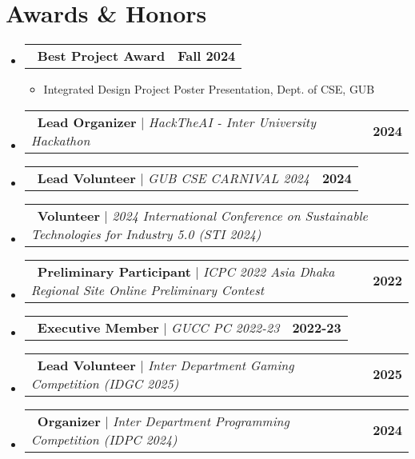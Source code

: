 \documentclass[letterpaper,11pt]{article}
\makeatletter
\newcommand{\resumeItem}[1]{
  \item\small{
    {#1 \vspace{-2pt}}
  }
}
\newcommand{\resumeProjectHeading}[2]{
    \item
    \begin{tabular*}{1.001\textwidth}{l@{\extracolsep{\fill}}r}
      \small#1 & \textbf{\small \color{primarycolor}#2}\\
    \end{tabular*}\vspace{-7pt}
}
\newcommand{\resumeSubHeadingListStart}{\begin{itemize}[leftmargin=0.0in, label={}]}
\newcommand{\resumeSubHeadingListEnd}{\end{itemize}}
\newcommand{\resumeItemListStart}{\begin{itemize}}
\newcommand{\resumeItemListEnd}{\end{itemize}\vspace{-5pt}}
\makeatother
\begin{document}
\section{Awards \& Honors}
\vspace{2pt}
    \resumeSubHeadingListStart
      \resumeProjectHeading
          {\faTrophy\ \textbf{\color{accentcolor}Best Project Award}}{Fall 2024}
          \resumeItemListStart
            \resumeItem{Integrated Design Project Poster Presentation, Dept. of CSE, GUB}
          \resumeItemListEnd
          \vspace{-10pt}
      \resumeProjectHeading
          {\faStar\ \textbf{\color{accentcolor}Lead Organizer} $|$ \emph{HackTheAI - Inter University Hackathon}}{2024}
          \vspace{-10pt}
      \resumeProjectHeading
          {\faStar\ \textbf{\color{accentcolor}Lead Volunteer} $|$ \emph{GUB CSE CARNIVAL 2024}}{2024}
          \vspace{-10pt}
      \resumeProjectHeading
          {\faHandshake\ \textbf{\color{accentcolor}Volunteer} $|$ \emph{2024 International Conference on Sustainable Technologies for Industry 5.0 (STI 2024)}}{}
          \vspace{-10pt}
      \resumeProjectHeading
          {\faCode\ \textbf{\color{accentcolor}Preliminary Participant} $|$ \emph{ICPC 2022 Asia Dhaka Regional Site Online Preliminary Contest}}{2022}
          \vspace{-10pt}
      \resumeProjectHeading
          {\faUsers\ \textbf{\color{accentcolor}Executive Member} $|$ \emph{GUCC PC 2022-23}}{2022-23}
          \vspace{-10pt}
      \resumeProjectHeading
          {\faGamepad\ \textbf{\color{accentcolor}Lead Volunteer} $|$ \emph{Inter Department Gaming Competition (IDGC 2025)}}{2025}
          \vspace{-10pt}
      \resumeProjectHeading
          {\faLaptopCode\ \textbf{\color{accentcolor}Organizer} $|$ \emph{Inter Department Programming Competition (IDPC 2024)}}{2024}
    \resumeSubHeadingListEnd
\vspace{-8pt}

\end{document}
